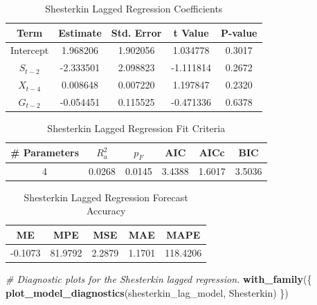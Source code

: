 \documentclass[
  10pt,
]{extarticle}
\newenvironment{Shaded}{\begin{snugshade}}{\end{snugshade}}
\newcommand{\CommentTok}[1]{\textcolor[rgb]{0.56,0.35,0.01}{\textit{#1}}}
\newcommand{\FunctionTok}[1]{\textcolor[rgb]{0.13,0.29,0.53}{\textbf{#1}}}
\newcommand{\NormalTok}[1]{#1}
\newcommand{\StringTok}[1]{\textcolor[rgb]{0.31,0.60,0.02}{#1}}
\begin{document}
\begin{center}
\scriptsize
\begin{table}[H]

\caption{\label{tab:shesterkin-lag-reg-coef}Shesterkin Lagged Regression Coefficients}
\centering
\begin{tabular}[t]{ccccc}
\toprule
Term & Estimate & Std. Error & t Value & P-value\\
\midrule
Intercept & 1.968206 & 1.902056 & 1.034778 & 0.3017\\
$S_{t-2}$ & -2.333501 & 2.098823 & -1.111814 & 0.2672\\
$X_{t-4}$ & 0.008648 & 0.007220 & 1.197847 & 0.2320\\
$G_{t-2}$ & -0.054451 & 0.115525 & -0.471336 & 0.6378\\
\bottomrule
\end{tabular}
\end{table}
\normalsize
\end{center}

\begin{center}
\scriptsize
\begin{table}[H]

\caption{\label{tab:shesterkin-lag-reg-fit}Shesterkin Lagged Regression Fit Criteria}
\centering
\begin{tabular}[t]{cccccc}
\toprule
\# Parameters & $R_a^2$ & $p_F$ & AIC & AICc & BIC\\
\midrule
4 & 0.0268 & 0.0145 & 3.4388 & 1.6017 & 3.5036\\
\bottomrule
\end{tabular}
\end{table}
\normalsize
\end{center}

\begin{center}
\scriptsize
\begin{table}[H]

\caption{\label{tab:shesterkin-lag-reg-fc}Shesterkin Lagged Regression Forecast Accuracy}
\centering
\begin{tabular}[t]{ccccc}
\toprule
ME & MPE & MSE & MAE & MAPE\\
\midrule
-0.1073 & 81.9792 & 2.2879 & 1.1701 & 118.4206\\
\bottomrule
\end{tabular}
\end{table}
\normalsize
\end{center}

\begin{Shaded}
\begin{Highlighting}[]
\CommentTok{\# Diagnostic plots for the Shesterkin lagged regression.}
\FunctionTok{with\_family}\NormalTok{(\{}
  \FunctionTok{plot\_model\_diagnostics}\NormalTok{(shesterkin\_lag\_model, }\StringTok{\textquotesingle{}Shesterkin\textquotesingle{}}\NormalTok{)}
\NormalTok{\})}
\end{Highlighting}
\end{Shaded}
\end{document}
